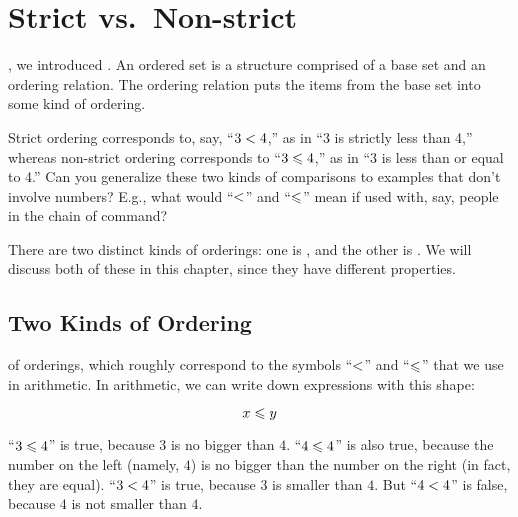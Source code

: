 \documentclass[../../../main.tex]{subfiles}
\begin{document}
\chapter{Strict vs.~Non-strict}
\label{ch:strict-vs-non-strict}

, we introduced . An ordered set is a structure comprised of a base set and an ordering relation. The ordering relation puts the items from the base set into some kind of ordering. 

\begin{ponder}
  Strict ordering corresponds to, say, ``$3 \strictorder/ 4$,'' as in ``3 is strictly less than 4,'' whereas non-strict ordering corresponds to ``$3 \order/ 4$,'' as in ``3 is less than or equal to 4.'' Can you generalize these two kinds of comparisons to examples that don't involve numbers? E.g., what would ``$\strictorder/$'' and ``$\order/$'' mean if used with, say, people in the chain of command? 
\end{ponder}

There are two distinct kinds of orderings: one is , and the other is . We will discuss both of these in this chapter, since they have different properties.


\section{Two Kinds of Ordering}

 of orderings, which roughly correspond to the symbols ``$\strictorder/$'' and ``$\order/$'' that we use in arithmetic. In arithmetic, we can write down expressions with this shape:

\begin{equation*}
  x \order/ y
\end{equation*}

\begin{aside}
  \begin{example}
    ``$3 \order/ 4$'' is true, because $3$ is no bigger than $4$. ``$4 \order/ 4$'' is also true, because the number on the left (namely, $4$) is no bigger than the number on the right (in fact, they are equal). ``$3 \strictorder/ 4$'' is true, because $3$ is smaller than $4$. But ``$4 \strictorder/ 4$'' is false, because $4$ is not smaller than $4$.
  \end{example}
\end{aside}
\end{document}
